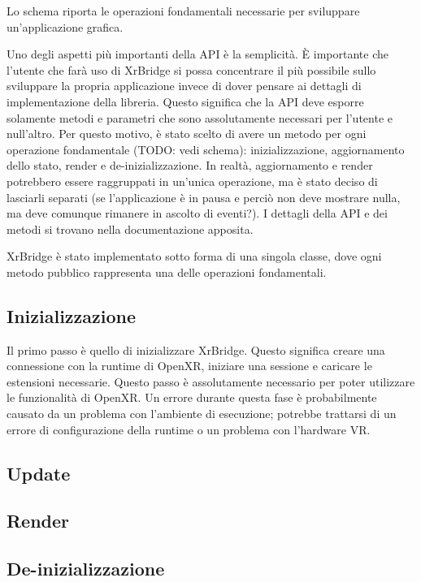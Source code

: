 \documentclass[twoside]{supsistudent}
\begin{document}
Lo schema riporta le operazioni fondamentali necessarie per sviluppare un'applicazione grafica.

Uno degli aspetti più importanti della API è la semplicità. È importante che l'utente che farà uso di XrBridge si possa concentrare il più possibile sullo sviluppare la propria applicazione invece di dover pensare ai dettagli di implementazione della libreria. Questo significa che la API deve esporre solamente metodi e parametri che sono assolutamente necessari per l'utente e null'altro. Per questo motivo, è stato scelto di avere un metodo per ogni operazione fondamentale (TODO: vedi schema): inizializzazione, aggiornamento dello stato, render e de-inizializzazione. In realtà, aggiornamento e render potrebbero essere raggruppati in un'unica operazione, ma è stato deciso di lasciarli separati (se l'applicazione è in pausa e perciò non deve mostrare nulla, ma deve comunque rimanere in ascolto di eventi?). I dettagli della API e dei metodi si trovano nella documentazione apposita.

XrBridge è stato implementato sotto forma di una singola classe, dove ogni metodo pubblico rappresenta una delle operazioni fondamentali.

\subsection{Inizializzazione}

Il primo passo è quello di inizializzare XrBridge. Questo significa creare una connessione con la runtime di OpenXR, iniziare una sessione e caricare le estensioni necessarie. Questo passo è assolutamente necessario per poter utilizzare le funzionalità di OpenXR. Un errore durante questa fase è probabilmente causato da un problema con l'ambiente di esecuzione; potrebbe trattarsi di un errore di configurazione della runtime o un problema con l'hardware VR.

\subsection{Update}


\subsection{Render}


\subsection{De-inizializzazione}
\end{document}
